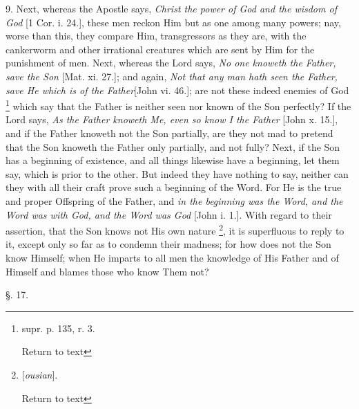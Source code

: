 9. Next, whereas the Apostle says, \emph{Christ the
power of God and the wisdom of God} [1 Cor. i. 24.], these men
reckon Him but as one among many powers; nay, worse than this, they
compare Him, transgressors as they are, with the cankerworm and other
irrational creatures which are sent by Him for the punishment of men.
Next, whereas the Lord says, \emph{No one knoweth the Father, save the
Son} [Mat. xi. 27.]; and again, \emph{Not that any man hath seen the
Father, save He which is of the Father}[John vi. 46.]; are not
these indeed enemies of God \footnote{supr. p. 135, r. 3.

Return to text} which
say that the Father is neither seen nor known of the Son
perfectly? If the Lord says, \emph{As the Father knoweth Me, even so know
I the Father} [John x. 15.], and if the Father knoweth not the Son
partially, are they not mad to pretend that the Son knoweth the Father
only partially, and not fully? Next, if the Son has a beginning of
existence, and all things likewise have a beginning, let them say,
which is prior to the other. But indeed they have nothing to say,
neither can they with all their craft prove such a beginning of the
Word. For He is the true and proper Offspring of the Father, and \emph{in
the beginning was the Word, and the Word was with God, and the Word
was God} [John i. 1.]. With regard to their assertion, that the Son
knows not His own nature \footnote{[\emph{ousian}].

Return to text}, it is
superfluous to reply to it, except only so far as to condemn their
madness; for how does not the Son know Himself; when He imparts to all
men the knowledge of His Father and of Himself and blames those who
know Them not?

§. 17.

